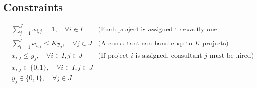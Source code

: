 \documentclass{article}
\begin{document}
\subsection*{Constraints}
\begin{align}
& \sum_{j=1}^{J} x_{i,j} = 1, \quad \forall i \in I & \text{(Each project is assigned to exactly one consultant)} \\
& \sum_{i=1}^{I} x_{i,j} \leq K y_j, \quad \forall j \in J & \text{(A consultant can handle up to } K \text{ projects)} \\
& x_{i,j} \leq y_j, \quad \forall i \in I, j \in J & \text{(If project } i \text{ is assigned, consultant } j \text{ must be hired)} \\
& x_{i,j} \in \{0, 1\}, \quad \forall i \in I, j \in J & \\
& y_j \in \{0, 1\}, \quad \forall j \in J &
\end{align}
\end{document}
